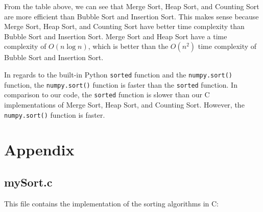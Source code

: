 \documentclass[12pt]{article}
\begin{document}
From the table above, we can see that Merge Sort, Heap Sort, and Counting Sort are more efficient than Bubble Sort and Insertion Sort.
This makes sense because Merge Sort, Heap Sort, and Counting Sort have better time complexity than Bubble Sort and Insertion Sort.
Merge Sort and Heap Sort have a time complexity of $O(n\log n)$, which is better than the $O(n^2)$ time complexity of Bubble Sort and Insertion Sort.

In regards to the built-in Python \texttt{sorted} function and the \texttt{numpy.sort()} function, the \texttt{numpy.sort()} function is faster than the \texttt{sorted} function.
In comparison to our code, the \texttt{sorted} function is slower than our C implementations of Merge Sort, Heap Sort, and Counting Sort.
However, the \texttt{numpy.sort()} function is faster.

\section{Appendix}

\subsection{mySort.c}

This file contains the implementation of the sorting algorithms in C:
\end{document}
